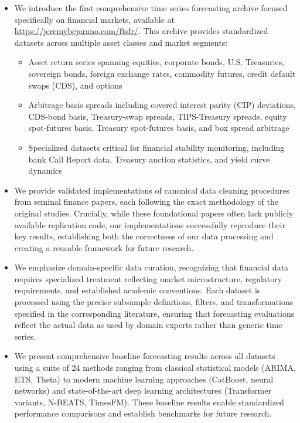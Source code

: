 \documentclass{article}
\begin{document}
\begin{itemize}
    \item We introduce the first comprehensive time series forecasting archive focused specifically on financial markets, available at \url{https://jeremybejarano.com/ftsfr/}. This archive provides standardized datasets across multiple asset classes and market segments:
    \begin{itemize}
        \item Asset return series spanning equities, corporate bonds, U.S. Treasuries, sovereign bonds, foreign exchange rates, commodity futures, credit default swaps (CDS), and options
        \item Arbitrage basis spreads including covered interest parity (CIP) deviations, CDS-bond basis, Treasury-swap spreads, TIPS-Treasury spreads, equity spot-futures basis, Treasury spot-futures basis, and box spread arbitrage
        \item Specialized datasets critical for financial stability monitoring, including bank Call Report data, Treasury auction statistics, and yield curve dynamics
    \end{itemize}
    
    \item We provide validated implementations of canonical data cleaning procedures from seminal finance papers, each following the exact methodology of the original studies. Crucially, while these foundational papers often lack publicly available replication code, our implementations successfully reproduce their key results, establishing both the correctness of our data processing and creating a reusable framework for future research.
    
    \item We emphasize domain-specific data curation, recognizing that financial data requires specialized treatment reflecting market microstructure, regulatory requirements, and established academic conventions. Each dataset is processed using the precise subsample definitions, filters, and transformations specified in the corresponding literature, ensuring that forecasting evaluations reflect the actual data as used by domain experts rather than generic time series.
    
    \item We present comprehensive baseline forecasting results across all datasets using a suite of 24 methods ranging from classical statistical models (ARIMA, ETS, Theta) to modern machine learning approaches (CatBoost, neural networks) and state-of-the-art deep learning architectures (Transformer variants, N-BEATS, TimesFM). These baseline results enable standardized performance comparisons and establish benchmarks for future research.
    

\end{itemize}
\end{document}
